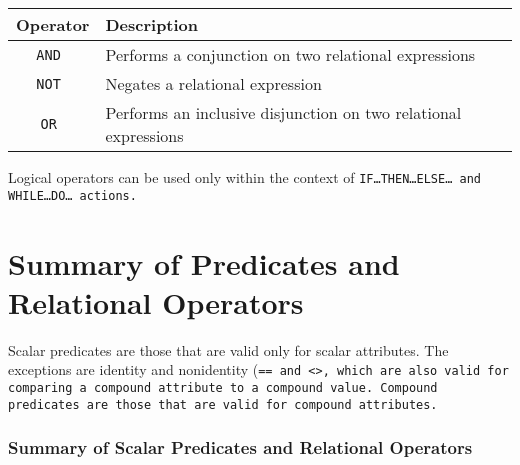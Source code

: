   \begin{tabularx}{\columnwidth}{cX}
    \toprule
    Operator & Description\\
    \midrule
    \tt{AND} & Performs a conjunction on two relational expressions \\
    \tt{NOT} & Negates a relational expression\\
    \tt{OR} & Performs an inclusive disjunction on two 
              relational expressions \\
    \bottomrule
  \end{tabularx}

\begin{note}
  Logical operators can be used only within the context of
  \tt{IF}\ldots\tt{THEN}\ldots\tt{ELSE}\ldots{} and
  \tt{WHILE}\ldots\tt{DO}\ldots{} actions.
\end{note}

\section{Summary of Predicates and Relational Operators}

Scalar predicates are those that are valid only for scalar
attributes. The exceptions are identity and nonidentity (\tt{==} and
\tt{<>}, which are also valid for comparing a compound attribute to a
compound value. Compound predicates are those that are valid for
compound attributes.

\subsubsection{Summary of Scalar Predicates and Relational Operators}

